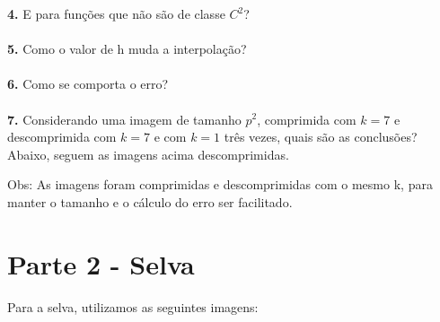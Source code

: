 \documentclass[12pt,letterpaper]{article}
\begin{document}
	\textbf{4.} E para funções que não são de classe $C^2$? \\
	\\
	
	\textbf{5.} Como o valor de h muda a interpolação? \\
	\\
	
	\textbf{6.} Como se comporta o erro?\\
	\\
	
	\textbf{7.} Considerando uma imagem de tamanho $p^2$, comprimida com $k = 7$ e descomprimida com $k = 7$ e com $k = 1$ três vezes, quais são as conclusões?\\
	
	Abaixo, seguem as imagens acima descomprimidas.
	
	\begin{figure}[h]
	\end{figure}

	
	\begin{figure}[h]
	\end{figure}
	
	\begin{figure}[h]
	\end{figure}
	
	\clearpage
	
	Obs: As imagens foram comprimidas e descomprimidas com o mesmo k, para manter o tamanho e o cálculo do erro ser facilitado.
	
	\section{Parte 2 - Selva}
	
	Para a selva, utilizamos as seguintes imagens:
	
\end{document}

